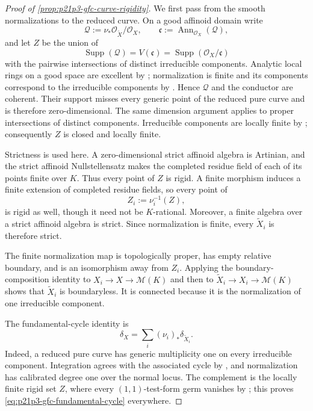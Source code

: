 \begin{proof}[Proof of \cref{prop:p21p3-gfc-curve-rigidity}]
We first pass from the smooth normalizations to the reduced curve.  On a
good affinoid domain write
\[
 \mathcal Q:=\nu_*\mathcal O_{\widetilde X}/\mathcal O_X,
 \qquad
 \mathfrak c:=\operatorname{Ann}_{\mathcal O_X}(\mathcal Q),
\]
and let $Z$ be the union of
\[
 \operatorname{Supp}(\mathcal Q)
   =V(\mathfrak c)
   =\operatorname{Supp}(\mathcal O_X/\mathfrak c)
\]
with the pairwise intersections of distinct irreducible components.
Analytic local rings on a good space are excellent by
\cite[\S11.1.10]{CLD25}; normalization is finite and its components
correspond to the irreducible components by
\cite[\S11.3.1]{CLD25}.  Hence $\mathcal Q$ and the conductor are
coherent.  Their support misses every generic point of the reduced pure
curve and is therefore zero-dimensional.  The same dimension argument
applies to proper intersections of distinct components.  Irreducible
components are locally finite by \cite[\S11.2.5]{CLD25}; consequently
$Z$ is closed and locally finite.

Strictness is used here.  A zero-dimensional strict affinoid algebra is
Artinian, and the strict affinoid Nullstellensatz makes the completed
residue field of each of its points finite over $K$.  Thus every point
of $Z$ is rigid.  A finite morphism induces a finite extension of
completed residue fields, so every point of
\begin{equation}
\label{eq:p21p3-gfc-conductor-preimage}
                         Z_i:=\nu_i^{-1}(Z),
\end{equation}
is rigid as well, though it need not be $K$-rational.  Moreover, a finite
algebra over a strict affinoid algebra is strict.  Since normalization is
finite, every $\widetilde X_i$ is therefore strict.

The finite normalization map is topologically proper, has empty relative
boundary, and is an isomorphism away from $Z_i$.  Applying the
boundary-composition identity \cite[(11.4.1.3)]{CLD25} to
$X_i\to X\to\mathcal M(K)$ and then to
$\widetilde X_i\to X_i\to\mathcal M(K)$ shows that
$\widetilde X_i$ is boundaryless.  It is connected because it is the
normalization of one irreducible component.

The fundamental-cycle identity is
\begin{equation}
\label{eq:p21p3-gfc-fundamental-cycle}
             \delta_X=\sum_i(\nu_i)_*\delta_{\widetilde X_i}.
\end{equation}
Indeed, a reduced pure curve has generic multiplicity one on every
irreducible component.  Integration agrees with the associated cycle by
\cite[Proposition~16.6.3]{CLD25}, and normalization has calibrated degree
one over the normal locus.  The complement is the locally finite rigid
set $Z$, where every $(1,1)$-test-form germ vanishes by
\cite[Proposition~3.3.6]{CLD25}; this proves
\eqref{eq:p21p3-gfc-fundamental-cycle} everywhere.


\end{proof}
